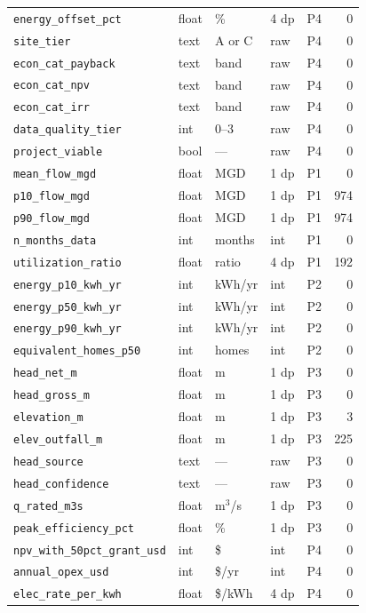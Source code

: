 \documentclass[12pt,letterpaper]{report}
\begin{document}
\begin{longtable}{@{}lllllr@{}}
\texttt{energy\_offset\_pct} & float & \% & 4 dp & P4 & 0 \\
\texttt{site\_tier} & text & A or C & raw & P4 & 0 \\
\texttt{econ\_cat\_payback} & text & band & raw & P4 & 0 \\
\texttt{econ\_cat\_npv} & text & band & raw & P4 & 0 \\
\texttt{econ\_cat\_irr} & text & band & raw & P4 & 0 \\
\texttt{data\_quality\_tier} & int & 0--3 & raw & P4 & 0 \\
\texttt{project\_viable} & bool & --- & raw & P4 & 0 \\
\texttt{mean\_flow\_mgd} & float & MGD & 1 dp & P1 & 0 \\
\texttt{p10\_flow\_mgd} & float & MGD & 1 dp & P1 & 974 \\
\texttt{p90\_flow\_mgd} & float & MGD & 1 dp & P1 & 974 \\
\texttt{n\_months\_data} & int & months & int & P1 & 0 \\
\texttt{utilization\_ratio} & float & ratio & 4 dp & P1 & 192 \\
\texttt{energy\_p10\_kwh\_yr} & int & kWh/yr & int & P2 & 0 \\
\texttt{energy\_p50\_kwh\_yr} & int & kWh/yr & int & P2 & 0 \\
\texttt{energy\_p90\_kwh\_yr} & int & kWh/yr & int & P2 & 0 \\
\texttt{equivalent\_homes\_p50} & int & homes & int & P2 & 0 \\
\texttt{head\_net\_m} & float & m & 1 dp & P3 & 0 \\
\texttt{head\_gross\_m} & float & m & 1 dp & P3 & 0 \\
\texttt{elevation\_m} & float & m & 1 dp & P3 & 3 \\
\texttt{elev\_outfall\_m} & float & m & 1 dp & P3 & 225 \\
\texttt{head\_source} & text & --- & raw & P3 & 0 \\
\texttt{head\_confidence} & text & --- & raw & P3 & 0 \\
\texttt{q\_rated\_m3s} & float & m$^3$/s & 1 dp & P3 & 0 \\
\texttt{peak\_efficiency\_pct} & float & \% & 1 dp & P3 & 0 \\
\texttt{npv\_with\_50pct\_grant\_usd} & int & \$ & int & P4 & 0 \\
\texttt{annual\_opex\_usd} & int & \$/yr & int & P4 & 0 \\
\texttt{elec\_rate\_per\_kwh} & float & \$/kWh & 4 dp & P4 & 0 \\

\end{longtable}
\end{document}
